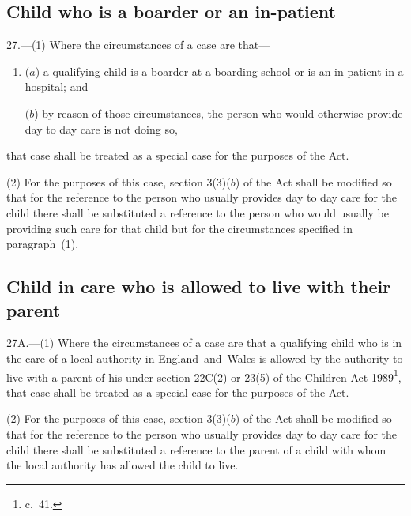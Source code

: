 \documentclass[12pt,a4paper]{article}
\begin{document}
\subsection[27. Child who is a boarder or an in-patient]{Child who is a boarder or an in-patient}

27.—(1) Where the circumstances of a case are that—
\begin{enumerate}\item[]
($a$) a qualifying child is a boarder at a boarding school or is an in-patient in a hospital; and

($b$) by reason of those circumstances, the person who would otherwise provide day to day care is not doing so,
\end{enumerate}
that case shall be treated as a special case for the purposes of the Act.

(2) For the purposes of this case, section 3(3)($b$) of the Act shall be modified so 
that %
for the reference to the person who usually provides day to day care for the child there shall be substituted a reference to the person who would usually be providing such care for that child but for the circumstances specified in paragraph~(1).


\subsection[27A. 
Child in care who is allowed to live with their parent%
]{%
Child in care who is allowed to live with their parent%
}

27A.—(1) Where the circumstances of a case are that a qualifying child who is in the care of a local authority in England~and~Wales is allowed by the authority to live with a parent of his under section 
22C(2) or  %
23(5) of the Children Act 1989\footnote{ c.~41.}, that case shall be treated as a special case for the purposes of the Act.%

(2) For the purposes of this case, section 3(3)($b$) of the Act shall be modified so that for the reference to the person who usually provides day to day care for the child there shall be substituted a reference to the parent of a child 
with  %
whom the local authority 
has allowed the child to live.  %
\end{document}
